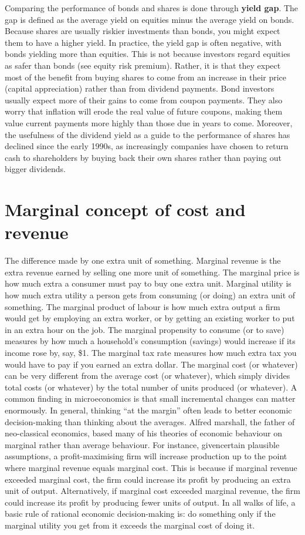 \documentclass[11pt,]{book}
\theoremstyle{definition}
\theoremstyle{definition}
\theoremstyle{definition}
\theoremstyle{remark}
\begin{document}
Comparing the performance of bonds and shares is done through
\textbf{yield gap}. The gap is defined as the average yield on equities
minus the average yield on bonds. Because shares are usually riskier
investments than bonds, you might expect them to have a higher yield. In
practice, the yield gap is often negative, with bonds yielding more than
equities. This is not because investors regard equities as safer than
bonds (see equity risk premium). Rather, it is that they expect most of
the benefit from buying shares to come from an increase in their price
(capital appreciation) rather than from dividend payments. Bond
investors usually expect more of their gains to come from coupon
payments. They also worry that inflation will erode the real value of
future coupons, making them value current payments more highly than
those due in years to come. Moreover, the usefulness of the dividend
yield as a guide to the performance of shares has declined since the
early 1990s, as increasingly companies have chosen to return cash to
shareholders by buying back their own shares rather than paying out
bigger dividends.

\section{Marginal concept of cost and
revenue}\label{marginal-concept-of-cost-and-revenue}

The difference made by one extra unit of something. Marginal revenue is
the extra revenue earned by selling one more unit of something. The
marginal price is how much extra a consumer must pay to buy one extra
unit. Marginal utility is how much extra utility a person gets from
consuming (or doing) an extra unit of something. The marginal product of
labour is how much extra output a firm would get by employing an extra
worker, or by getting an existing worker to put in an extra hour on the
job. The marginal propensity to consume (or to save) measures by how
much a household's consumption (savings) would increase if its income
rose by, say, \$1. The marginal tax rate measures how much extra tax you
would have to pay if you earned an extra dollar. The marginal cost (or
whatever) can be very different from the average cost (or whatever),
which simply divides total costs (or whatever) by the total number of
units produced (or whatever). A common finding in microeconomics is that
small incremental changes can matter enormously. In general, thinking
``at the margin'' often leads to better economic decision-making than
thinking about the averages. Alfred marshall, the father of
neo-classical economics, based many of his theories of economic
behaviour on marginal rather than average behaviour. For instance,
givencertain plausible assumptions, a profit-maximising firm will
increase production up to the point where marginal revenue equals
marginal cost. This is because if marginal revenue exceeded marginal
cost, the firm could increase its profit by producing an extra unit of
output. Alternatively, if marginal cost exceeded marginal revenue, the
firm could increase its profit by producing fewer units of output. In
all walks of life, a basic rule of rational economic decision-making is:
do something only if the marginal utility you get from it exceeds the
marginal cost of doing it.
\end{document}
